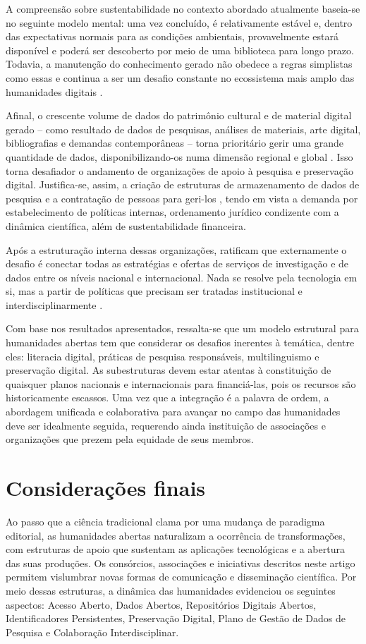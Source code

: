 \documentclass[portuguese]{textolivre}
\begin{document}
A compreensão sobre sustentabilidade no contexto abordado atualmente baseia-se no seguinte modelo mental: uma vez concluído, é relativamente estável e, dentro das expectativas normais para as condições ambientais, provavelmente estará disponível e poderá ser descoberto por meio de uma biblioteca para longo prazo. Todavia, a manutenção do conhecimento gerado não obedece a regras simplistas como essas e continua a ser um desafio constante no ecossistema mais amplo das humanidades digitais \cite{edmond2020}.

Afinal, o crescente volume de dados do patrimônio cultural e de material digital gerado – como resultado de dados de pesquisas, análises de materiais, arte digital, bibliografias e demandas contemporâneas – torna prioritário gerir uma grande quantidade de dados, disponibilizando-os numa dimensão regional e global \cite{fresa2013}. Isso torna desafiador o andamento de organizações de apoio à pesquisa e preservação digital. Justifica-se, assim, a criação de estruturas de armazenamento de dados de pesquisa e a contratação de pessoas para geri-los \cite{ahmad2022,cordeiro2018}, tendo em vista a demanda por estabelecimento de políticas internas, ordenamento jurídico condizente com a dinâmica científica, além de sustentabilidade financeira.

Após a estruturação interna dessas organizações, \textcite{risslerpipka2023} ratificam que externamente o desafio é conectar todas as estratégias e ofertas de serviços de investigação e de dados entre os níveis nacional e internacional. Nada se resolve pela tecnologia em si, mas a partir de políticas que precisam ser tratadas institucional e interdisciplinarmente \cite{luz2018}.

Com base nos resultados apresentados, ressalta-se que um modelo estrutural para humanidades abertas tem que considerar os desafios inerentes à temática, dentre eles: literacia digital, práticas de pesquisa responsáveis, multilinguismo e preservação digital. As subestruturas devem estar atentas à constituição de quaisquer planos nacionais e internacionais para financiá-las, pois os recursos são historicamente escassos. Uma vez que a integração é a palavra de ordem, a abordagem unificada e colaborativa para avançar no campo das humanidades deve ser idealmente seguida, requerendo ainda instituição de associações e organizações que prezem pela equidade de seus membros.

\section{Considerações finais}\label{sec-autores}
Ao passo que a ciência tradicional clama por uma mudança de paradigma editorial, as humanidades abertas naturalizam a ocorrência de transformações, com estruturas de apoio que sustentam as aplicações tecnológicas e a abertura das suas produções. Os consórcios, associações e iniciativas descritos neste artigo permitem vislumbrar novas formas de comunicação e disseminação científica. Por meio dessas estruturas, a dinâmica das humanidades evidenciou os seguintes aspectos: Acesso Aberto, Dados Abertos, Repositórios Digitais Abertos, Identificadores Persistentes, Preservação Digital, Plano de Gestão de Dados de Pesquisa e Colaboração Interdisciplinar.
\end{document}
